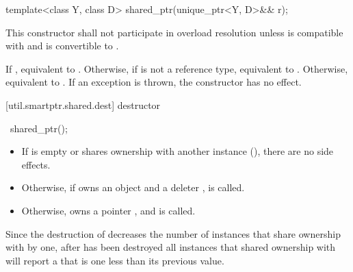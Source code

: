 %
%
\begin{itemdecl}
template<class Y, class D> shared_ptr(unique_ptr<Y, D>&& r);
\end{itemdecl}

\begin{itemdescr}
\pnum\remarks This constructor shall not participate in overload resolution
unless  is compatible with  and
 is convertible to .

\pnum
\effects If , equivalent to .
Otherwise, if  is not a reference type,
equivalent to .
Otherwise, equivalent to .
If an exception is thrown, the constructor has no effect.
\end{itemdescr}

[util.smartptr.shared.dest]{ destructor}

%
\begin{itemdecl}
~shared_ptr();
\end{itemdecl}

\begin{itemdescr}
\pnum\effects
\begin{itemize}
\item If  is empty or shares ownership with another
 instance (), there are no side effects.

\item
Otherwise, if  owns an object
 and a deleter ,  is called.

\item Otherwise,  owns a pointer ,
and  is called.
\end{itemize}
\end{itemdescr}

\pnum
\begin{note} Since the destruction of 
decreases the number of instances that share ownership with 
by one,
after  has been destroyed
all  instances that shared ownership with
 will report a  that is one less
than its previous value. \end{note}

